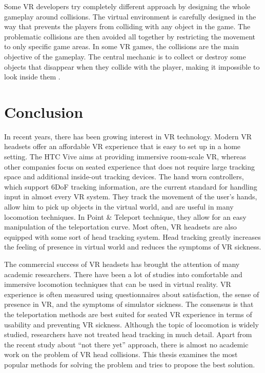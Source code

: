 Some VR developers try completely different approach by designing the whole gameplay around collisions. The virtual environment is carefully designed in the way that prevents the players from colliding with any object in the game. The problematic collisions are then avoided all together by restricting the movement to only specific game areas. In some VR games, the collisions are the main objective of the gameplay. The central mechanic is to collect or destroy some objects that disappear when they collide with the player, making it impossible to look inside them \cite{ELEVR}. 

\section{Conclusion}

In recent years, there has been growing interest in VR technology. Modern VR headsets offer an affordable VR experience that is easy to set up in a home setting. The HTC Vive aims at providing immersive room-scale VR, whereas other companies focus on seated experience that does not require large tracking space and additional inside-out tracking devices. The hand worn controllers, which support 6DoF tracking information, are the current standard for handling input in almost every VR system. They track the movement of the user's hands, allow him to pick up objects in the virtual world, and are useful in many locomotion techniques. In Point \& Teleport technique, they allow for an easy manipulation of the teleportation curve. Most often, VR headsets are also equipped with some sort of head tracking system. Head tracking greatly increases the feeling of presence in virtual world and reduces the symptoms of VR sickness.

The commercial success of VR headsets has brought the attention of many academic researchers. There have been a lot of studies into comfortable and immersive locomotion techniques that can be used in virtual reality. VR experience is often measured using questionnaires about satisfaction, the sense of presence in VR, and the symptoms of simulator sickness. The consensus is that the teleportation methods are best suited for seated VR experience in terms of usability and preventing VR sickness. Although the topic of locomotion is widely studied, researchers have not treated head tracking in much detail. Apart from the recent study about ``not there yet'' approach, there is almost no academic work on the problem of VR head collisions. This thesis examines the most popular methods for solving the problem and tries to propose the best solution.